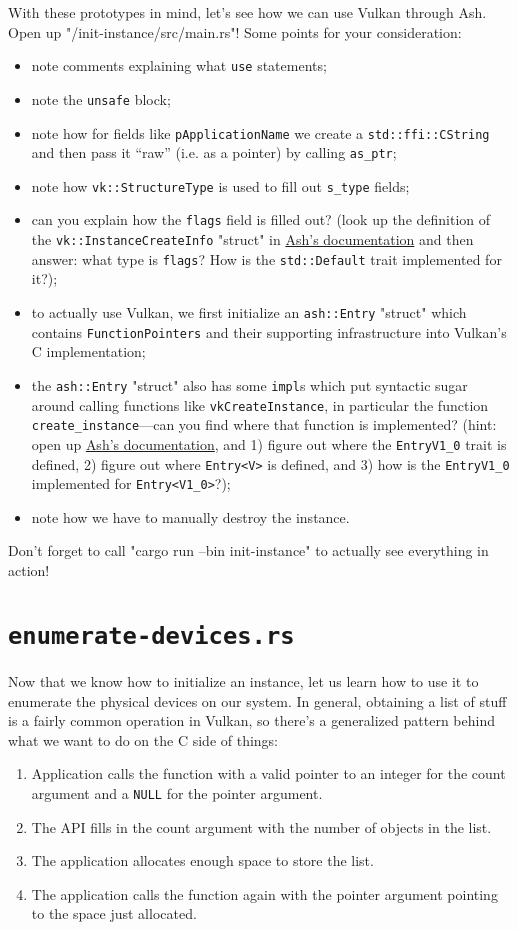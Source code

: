 \documentclass[12pt,letterpaper]{article}
\newcommand{\inquotes}[1]{``#1''}	%
\newcommand{\ril}[1]{\texttt{#1}}
\newcommand{\cil}[1]{\texttt{#1}}
\newcommand{\vulkanquerypattern}{
	\begin{enumerate}
		\item Application calls the function with a valid pointer to an integer for the count argument and a \cil{NULL} for the pointer argument.
		
		\item The API fills in the count argument with the number of objects in the list.
		
		\item The application allocates enough space to store the list.
		
		\item The application calls the function again with the pointer argument pointing to the space just allocated.
	\end{enumerate}
}
\begin{document}
	With these prototypes in mind, let's see how we can use Vulkan through Ash. Open up "/init-instance/src/main.rs"! Some points for your consideration:
		\begin{itemize}
			\item note comments explaining what \ril{use} statements;
			
			\item note the \ril{unsafe} block;
			
			\item note how for fields like \cil{pApplicationName} we create a \ril{std::ffi::CString} and then pass it \inquotes{raw} (i.e. as a pointer) by calling \ril{as_ptr};
			
			\item note how \ril{vk::StructureType} is used to fill out \ril{s_type} fields;
			
			\item can you explain how the \ril{flags} field is filled out? (look up the definition of the \ril{vk::InstanceCreateInfo} "struct" in \href{https://docs.rs/ash}{Ash's documentation} and then answer: what type is \ril{flags}? How is the \ril{std::Default} trait implemented for it?);
			
			\item to actually use Vulkan, we first initialize an \ril{ash::Entry} "struct" which contains \ril{FunctionPointers} and their supporting infrastructure into Vulkan's C implementation;
			
			\item the \ril{ash::Entry} "struct" also has some \ril{impl}s which put syntactic sugar around calling functions like \ril{vkCreateInstance}, in particular the function \ril{create_instance}---can you find where that function is implemented? (hint: open up \href{https://docs.rs/ash}{Ash's documentation}, and 1) figure out where the \ril{EntryV1_0} trait is defined, 2) figure out where \ril{Entry<V>} is defined, and 3) how is the \ril{EntryV1_0} implemented for \ril{Entry<V1_0>}?);
			
			\item note how we have to manually destroy the instance.
		\end{itemize} 
	
	Don't forget to call "cargo run --bin init-instance" to actually see everything in action!
	
\section{\texttt{enumerate-devices.rs}}
	Now that we know how to initialize an instance, let us learn how to use it to enumerate the physical devices on our system. In general, obtaining a list of stuff is a fairly common operation in Vulkan, so there's a generalized pattern behind what we want to do on the C side of things: \vulkanquerypattern
	
\end{document}
